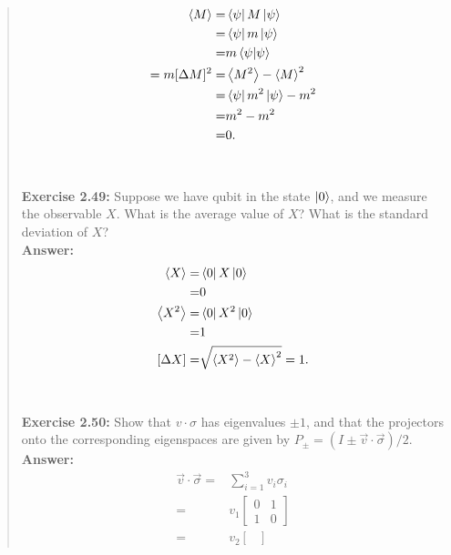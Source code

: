 \documentclass[UTF8]{ctexart}
\begin{document}
\begin{quote}
\begin{equation}
	\begin{aligned}
		\left \langle M\right\rangle=&\bra{\psi}M\ket{\psi}\\
									=&\bra{\psi}m\ket{\psi} \\
									=&m\bra{\psi}\ket{\psi} \\
									=m
		[\Delta M]^{2}=&\left \langle M^{2}\right\rangle-\left \langle M\right\rangle^{2}\\
					  =&\bra{\psi}m^{2}\ket{\psi}-m^{2} \\
					  =&m^{2}-m^{2} \\
					  =&0.
	\end{aligned}
\end{equation} 
\\
\\
\textbf{Exercise 2.49: } Suppose we have qubit in the state $\ket{0}$, and we measure the observable $X$. 
What is the average value of $X$? What is the standard deviation of $X$?
\\
\textbf{Answer:}\\
\begin{equation}
	\begin{aligned}
		\left \langle X\right\rangle=&\bra{0}X\ket{0} \\
									=&0\\
		\left \langle X^{2}\right\rangle=&\bra{0}X^{2}\ket{0} \\
									=&1\\
		[\Delta X]=&\sqrt{\left \langle X^{2}\right\rangle-\left \langle X\right\rangle^{2}}=1.				
	\end{aligned}
	\end{equation}
\\
\\
\textbf{Exercise 2.50: } Show that $v\cdot \sigma$ has eigenvalues $\pm1$, 
and that the projectors onto the corresponding eigenspaces are given
 by $P_{\pm} = (I \pm \vec{v}\cdot \vec{\sigma})/2$.
 \\
\textbf{Answer:}	 \\
\begin{equation}
	\begin{aligned}
\vec{v}\cdot\vec{\sigma}=&\sum_{i=1}^{3}v_{i}\sigma_{i}\\
						=&v_{1}\begin{bmatrix}
							0 &1 \\1 & 0
						\end{bmatrix} \\
						=&v_{2}\begin{bmatrix}

\end{bmatrix}
\end{aligned}
\end{equation}
\end{quote}
\end{document}
